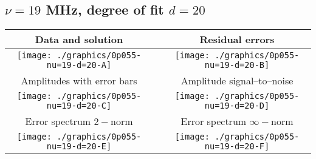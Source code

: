 

% 

\clearpage{}
\break{}

\subsection{$\nu = 19$ MHz, degree of fit $d = 20$}

\begin{table}[h]
    \begin{center}
        \begin{tabular}{ccc}
            Data and solution & \quad & Residual errors \\\hline
            \texttt{[image: ./graphics/0p055-nu=19-d=20-A]} &&
            \texttt{[image: ./graphics/0p055-nu=19-d=20-B]} \\[15pt]
            Amplitudes with error bars && Amplitude signal--to--noise \\\hline
            \texttt{[image: ./graphics/0p055-nu=19-d=20-C]} &&
            \texttt{[image: ./graphics/0p055-nu=19-d=20-D]} \\[15pt]
            Error spectrum $2-$norm && Error spectrum $\infty-$norm \\\hline
            \texttt{[image: ./graphics/0p055-nu=19-d=20-E]} &&
            \texttt{[image: ./graphics/0p055-nu=19-d=20-F]} \\[15pt]
        \end{tabular}
    \end{center}
\label{fig:elev=55, nu=19}
\end{table}



\endinput
